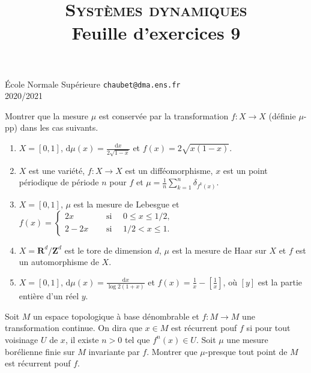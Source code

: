 \documentclass[a4paper,10pt,openany]{article}
\title{\textsc{Syst\`emes dynamiques} \\ Feuille d'exercices 9}
\date{}
\author{}
\theoremstyle{plain}
\theoremstyle{definition}
\newcommand{\dd}{\mathrm{d}}
\newcommand{\R}{\mathbf{R}}
\newcommand{\Z}{\mathbf{Z}}
\begin{document}
{\noindent \'Ecole Normale Sup\'erieure  \hfill \texttt{chaubet@dma.ens.fr} } \\
{2020/2021 \hfill }

{\let\newpage\relax\maketitle}
\maketitle

 \vspace{1.5mm} 

\noindent Montrer que la mesure $\mu$ est conserv\'ee par la transformation $f : X \to X$ (d\'efinie $\mu$-pp) dans les cas suivants.
\begin{enumerate}
\item $X = [0,1]$, $\dd \mu(x) = \displaystyle{\frac{\dd x}{2\sqrt{1-x}}}$ et $f(x) = 2 \sqrt{x(1-x)}$.
\item $X$ est une vari\'et\'e, $f : X \to X$ est un diff\'eomorphisme, $x$ est un point p\'eriodique de p\'eriode $n$ pour $f$ et $\displaystyle{
\mu = \frac{1}{n} \sum_{k=1}^n \delta_{f^k(x)}.
}
$
\item $X = [0,1]$, $\mu$ est la mesure de Lebesgue et
$ \displaystyle{
f(x) = \left\{ \begin{matrix} 2x \quad &\text{ si }\quad  0\leq x \leq 1/2, \\ 2 -2x \quad &\text{ si } \quad 1/2 < x \leq 1. \end{matrix}\right.
}
$
\item $X = \R^d/\Z^d$ est le tore de dimension $d$, $\mu$ est la mesure de Haar sur $X$ et $f$ est un automorphisme de $X$.
\item $X = [0,1]$, $\dd \mu(x) = \displaystyle{\frac{\dd x}{\log2(1+x)}}$ et $\displaystyle{f(x) = \frac{1}{x} - \left[\frac{1}{x}\right]}$, o\`u $[y]$ est la partie enti\`ere d'un r\'eel $y$.
\end{enumerate}

\vspace{0.6cm}

 \vspace{1.5mm} 

\noindent Soit $M$ un espace topologique \`a base d\'enombrable et $f : M \to M$ une transformation continue. On dira que $x \in M$ est r\'ecurrent pouf $f$ si pour tout voisinage $U$ de $x$, il existe $n>0$ tel que $f^n(x) \in U$. Soit $\mu$ une mesure bor\'elienne finie sur $M$ invariante par $f$. Montrer que $\mu$-presque tout point de $M$ est r\'ecurrent pouf $f$. 
\vspace{0.6cm}
\end{document}
